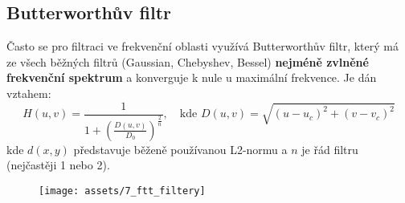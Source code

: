 \subsection{Butterworthův filtr}
Často se pro filtraci ve frekvenční oblasti využívá Butterworthův filtr, který má ze všech běžných filtrů (Gaussian, Chebyshev, Bessel) \textbf{nejméně zvlněné frekvenční spektrum} a konverguje k nule u maximální frekvence. Je dán vztahem:
\begin{equation*}
    H(u, v) = \frac{1}{1 + \left( \frac{D(u, v)}{D_0} \right)^{\frac{2}{n}}}, \quad \textrm{kde } D(u, v)=\sqrt{(u - u_c)^2 + (v - v_c)^2}
\end{equation*}
kde $d(x, y)$ představuje běženě používanou L2-normu a $n$ je řád filtru (nejčastěji 1 nebo 2).

\begin{figure}[H]
    \centering
    \texttt{[image: assets/7\_ftt\_filtery]}
\end{figure}